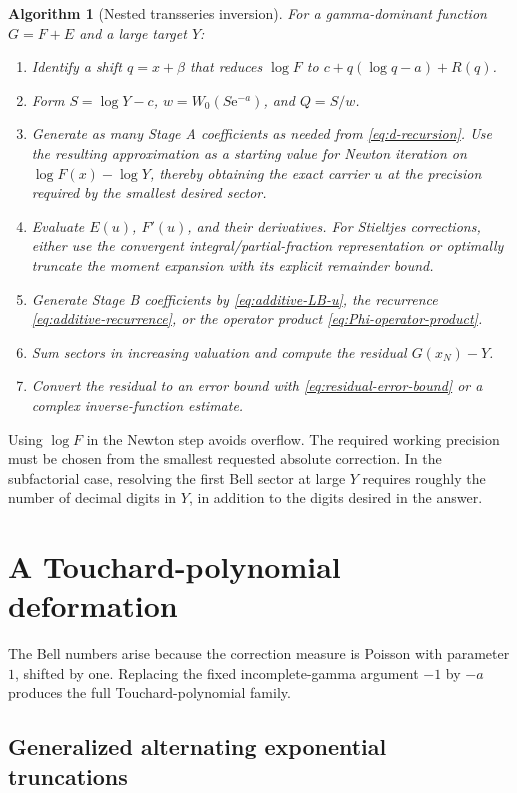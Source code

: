 \documentclass[11pt]{article}
\numberwithin{equation}{section}
\theoremstyle{mainthm}
\theoremstyle{defstyle}
\newtheorem{algorithm}[theorem]{Algorithm}
\theoremstyle{remark}
\newcommand{\e}{\mathrm e}
\begin{document}
\begin{algorithm}[Nested transseries inversion]\label{alg:nested-inversion}
For a gamma-dominant function \(G=F+E\) and a large target \(Y\):
\begin{enumerate}
\item Identify a shift \(q=x+\beta\) that reduces \(\log F\) to \(c+q(\log q-a)+R(q)\).
\item Form \(S=\log Y-c\), \(w=W_0(S\e^{-a})\), and \(Q=S/w\).
\item Generate as many Stage A coefficients as needed from \cref{eq:d-recursion}.  Use the resulting approximation as a starting value for Newton iteration on \(\log F(x)-\log Y\), thereby obtaining the exact carrier \(u\) at the precision required by the smallest desired sector.
\item Evaluate \(E(u)\), \(F'(u)\), and their derivatives.  For Stieltjes corrections, either use the convergent integral/partial-fraction representation or optimally truncate the moment expansion with its explicit remainder bound.
\item Generate Stage B coefficients by \cref{eq:additive-LB-u}, the recurrence \cref{eq:additive-recurrence}, or the operator product \cref{eq:Phi-operator-product}.
\item Sum sectors in increasing valuation and compute the residual \(G(x_N)-Y\).
\item Convert the residual to an error bound with \cref{eq:residual-error-bound} or a complex inverse-function estimate.
\end{enumerate}
\end{algorithm}

Using \(\log F\) in the Newton step avoids overflow.  The required working precision must be chosen from the smallest requested absolute correction.  In the subfactorial case, resolving the first Bell sector at large \(Y\) requires roughly the number of decimal digits in \(Y\), in addition to the digits desired in the answer.

\section{A Touchard-polynomial deformation}\label{sec:touchard}

The Bell numbers arise because the correction measure is Poisson with parameter \(1\), shifted by one.  Replacing the fixed incomplete-gamma argument \(-1\) by \(-a\) produces the full Touchard-polynomial family.

\subsection{Generalized alternating exponential truncations}
\end{document}
